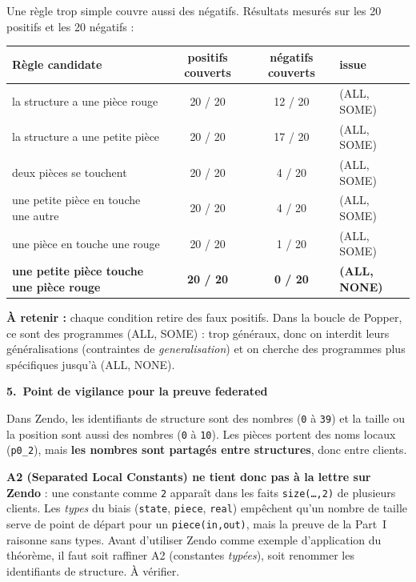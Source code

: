 \documentclass[10pt]{article}
\newcommand{\titrebox}[2]{\needspace{10\baselineskip}\vspace{8pt}
  \begin{tcolorbox}[colback=marine, colframe=marine, arc=0pt, boxrule=0pt,
    top=4pt, bottom=4pt, left=8pt]
  \color{white}\Large\bfseries #1.~#2
  \end{tcolorbox}\vspace{2pt}}
\newcommand{\ce}[1]{\begin{pourquoi}\textbf{\textcolor{marine}{À retenir :}} #1\end{pourquoi}}
\newcommand{\st}[1]{\par\needspace{7\baselineskip}\vspace{5pt}{\normalsize\bfseries\textcolor{marine}{#1}}\par\vspace{2pt}}
\begin{document}
\st{Pourquoi il faut les deux conditions : règles incomplètes}
Une règle trop simple couvre aussi des négatifs. Résultats mesurés sur les 20 positifs et les 20 négatifs :
\renewcommand{\arraystretch}{1.25}
\begin{center}
\begin{tabular}{@{}L{8.6cm}c c l@{}}
\textbf{Règle candidate} & \textbf{positifs couverts} & \textbf{négatifs couverts} & \textbf{issue}\\\hline
la structure a une pièce rouge & 20 / 20 & 12 / 20 & (ALL, SOME)\\
la structure a une petite pièce & 20 / 20 & 17 / 20 & (ALL, SOME)\\
deux pièces se touchent & 20 / 20 & 4 / 20 & (ALL, SOME)\\
une petite pièce en touche une autre & 20 / 20 & 4 / 20 & (ALL, SOME)\\
une pièce en touche une rouge & 20 / 20 & 1 / 20 & (ALL, SOME)\\
\textbf{une petite pièce touche une pièce rouge} & \textbf{20 / 20} & \textbf{0 / 20} & \textbf{(ALL, NONE)}\\
\end{tabular}
\end{center}
\ce{chaque condition retire des faux positifs. Dans la boucle de Popper, ce sont des programmes (ALL, SOME) : trop généraux, donc on interdit leurs généralisations (contraintes de \emph{generalisation}) et on cherche des programmes plus spécifiques jusqu'à (ALL, NONE).}

\titrebox{5}{Point de vigilance pour la preuve federated}
Dans Zendo, les identifiants de structure sont des nombres (\texttt{0} à \texttt{39}) et la taille ou la position sont aussi des nombres (\texttt{0} à \texttt{10}). Les pièces portent des noms locaux (\texttt{p0\_2}), mais \textbf{les nombres sont partagés entre structures}, donc entre clients.
\begin{piege}
\textbf{A2 (Separated Local Constants) ne tient donc pas à la lettre sur Zendo} : une constante comme \texttt{2} apparaît dans les faits \texttt{size(\ldots,2)} de plusieurs clients. Les \emph{types} du biais (\texttt{state}, \texttt{piece}, \texttt{real}) empêchent qu'un nombre de taille serve de point de départ pour un \texttt{piece(in,out)}, mais la preuve de la Part~I raisonne sans types. Avant d'utiliser Zendo comme exemple d'application du théorème, il faut soit raffiner A2 (constantes \emph{typées}), soit renommer les identifiants de structure. À vérifier.
\end{piege}
\end{document}
